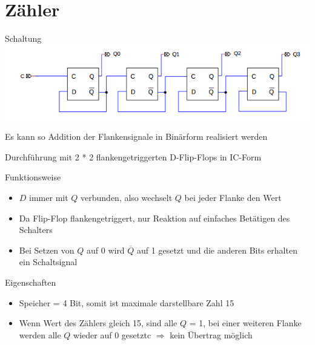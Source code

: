 \documentclass[compress,11pt]{beamer}
\begin{document}
\section{Zähler}
\begin{frame}
\begin{block}{Schaltung}
\includegraphics[scale=0.7]{zahler}
\end{block}
Es kann so Addition der Flankensignale in Binärform realisiert werden
\end{frame}
\begin{frame}

Durchführung mit 2 * 2 flankengetriggerten D-Flip-Flops in IC-Form

\begin{block}{Funktionsweise}
\begin{itemize}
\item $D$ immer mit $Q$ verbunden, also wechselt $Q$ bei jeder Flanke den Wert
\item Da Flip-Flop flankengetriggert, nur Reaktion auf einfaches Betätigen des Schalters
\item Bei Setzen von $Q$ auf 0 wird $\overline{Q}$ auf 1 gesetzt und die anderen Bits erhalten ein Schaltsignal
\end{itemize}
\end{block}
\end{frame}
\begin{frame}
\begin{block}{Eigenschaften}
\begin{itemize}
\item Speicher = 4 Bit, somit ist maximale darstellbare Zahl 15
\item Wenn Wert des Zählers gleich 15, sind alle $Q$ = 1, bei einer weiteren Flanke werden alle $Q$ wieder auf 0 gesetztc $\Rightarrow$ kein Übertrag möglich
\end{itemize}
\end{block}
\end{frame}
\end{document}
